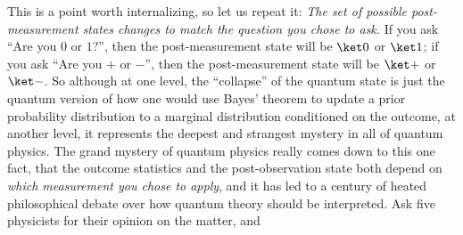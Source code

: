 	    This is a point worth internalizing, so let us repeat it: 
	      \emph{The set of possible post-measurement states changes to match
	      the question you chose to ask.} If you ask ``Are you $0$ or $1$?'', 
	      then the post-measurement state will be $\ket 0$ or $\ket 1$; 
	      if you ask ``Are you $+$ or $-$'', then the post-measurement state will
        be $\ket +$ or $\ket -$. 
        So although at one level, the ``collapse'' of the quantum state is just
        the quantum version of how one would use Bayes' theorem 
        to update a prior probability distribution to a marginal distribution
        conditioned on the outcome, at another level, it represents the
        deepest and strangest mystery in all of quantum physics.
        The grand mystery of quantum physics really comes down to this one fact, 
        that the outcome statistics and the post-observation state both depend
        on \emph{which measurement you chose to apply}, and it has led to a century
        of heated philosophical debate over how quantum theory should be
        interpreted. Ask five physicists for their opinion on the matter, and
